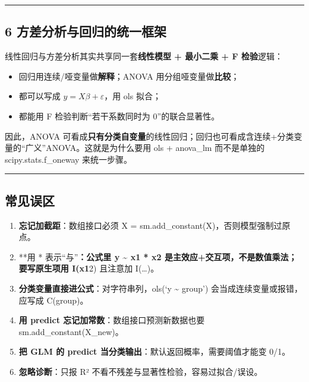 \begin{center}\rule{0.5\linewidth}{0.5pt}\end{center}

\subsection{6
方差分析与回归的统一框架}\label{ux65b9ux5deeux5206ux6790ux4e0eux56deux5f52ux7684ux7edfux4e00ux6846ux67b6}

线性回归与方差分析其实共享同一套\textbf{线性模型 + 最小二乘 + F
检验}逻辑：

\begin{itemize}
\tightlist
\item
  回归用连续/哑变量做\textbf{解释}；ANOVA 用分组哑变量做\textbf{比较}；
\item
  都可以写成 \(y = X\beta + \varepsilon\)，用 ols 拟合；
\item
  都能用 F 检验判断``若干系数同时为 0''的联合显著性。
\end{itemize}

因此，ANOVA
可看成\textbf{只有分类自变量}的线性回归；回归也可看成含连续+分类变量的``广义''ANOVA。这就是为什么要用
ols + anova\_lm 而不是单独的 scipy.stats.f\_oneway 来统一步骤。

\begin{center}\rule{0.5\linewidth}{0.5pt}\end{center}

\subsection{常见误区}\label{ux5e38ux89c1ux8befux533a-20}

\begin{enumerate}
\def\labelenumi{\arabic{enumi}.}
\tightlist
\item
  \textbf{忘记加截距}：数组接口必须 X =
  sm.add\_constant(X)，否则模型强制过原点。
\item
  **用 * 表示``与''\textbf{：公式里 y \textasciitilde{} x1 * x2
  是主效应+交互项，不是数值乘法；要写原生项用 I(x1}2) 且注意加
  I(\ldots)。
\item
  \textbf{分类变量直接进公式}：对字符串列，ols(`y \textasciitilde{}
  group') 会当成连续变量或报错，应写成 C(group)。
\item
  \textbf{用 predict 忘记加常数}：数组接口预测新数据也要
  sm.add\_constant(X\_new)。
\item
  \textbf{把 GLM 的 predict 当分类输出}：默认返回概率，需要阈值才能变
  0/1。
\item
  \textbf{忽略诊断}：只报 R² 不看不残差与显著性检验，容易过拟合/误设。
\end{enumerate}

